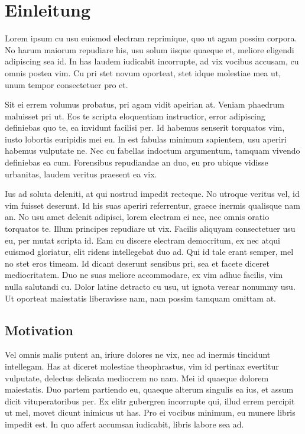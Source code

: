 \chapter{Einleitung}
\label{einleitung}
Lorem ipsum cu usu euismod electram reprimique, quo ut agam possim corpora. No harum maiorum repudiare his, usu solum iisque quaeque et, meliore eligendi adipiscing sea id. In has laudem iudicabit incorrupte, ad vix vocibus accusam, cu omnis postea vim. Cu pri stet novum oporteat, stet idque molestiae mea ut, unum tempor consectetuer pro et.

Sit ei errem volumus probatus, pri agam vidit apeirian at. Veniam phaedrum maluisset pri ut. Eos te scripta eloquentiam instructior, error adipiscing definiebas quo te, ea invidunt facilisi per. Id habemus senserit torquatos vim, iusto lobortis euripidis mei eu. In est fabulas minimum sapientem, usu aperiri habemus vulputate ne. Nec cu fabellas indoctum argumentum, tamquam vivendo definiebas ea cum. Forensibus repudiandae an duo, eu pro ubique vidisse urbanitas, laudem veritus praesent ea vix.

Ius ad soluta deleniti, at qui nostrud impedit recteque. No utroque veritus vel, id vim fuisset deserunt. Id his suas aperiri referrentur, graece inermis qualisque nam an. No usu amet delenit adipisci, lorem electram ei nec, nec omnis oratio torquatos te. Illum principes repudiare ut vix. Facilis aliquyam consectetuer usu eu, per mutat scripta id. Eam cu discere electram democritum, ex nec atqui euismod gloriatur, elit ridens intellegebat duo ad. Qui id tale erant semper, mel no stet eros timeam. Id dicant deserunt sensibus pri, sea et facete diceret mediocritatem. Duo ne suas meliore accommodare, ex vim adhuc facilis, vim nulla salutandi cu. Dolor latine detracto cu usu, ut ignota verear nonummy usu. Ut oporteat maiestatis liberavisse nam, nam possim tamquam omittam at.

\section{Motivation}
\label{einleitung_motivation}
Vel omnis malis putent an, iriure dolores ne vix, nec ad inermis tincidunt intellegam. Has at diceret molestiae theophrastus, vim id pertinax evertitur vulputate, delectus delicata mediocrem no nam. Mei id quaeque dolorem maiestatis. Duo partem partiendo eu, quaeque alterum singulis ea ius, et assum dicit vituperatoribus per. Ex elitr gubergren incorrupte qui, illud errem percipit ut mel, movet dicunt inimicus ut has. Pro ei vocibus minimum, eu munere libris impedit est. In quo affert accumsan iudicabit, libris labore sea ad.


